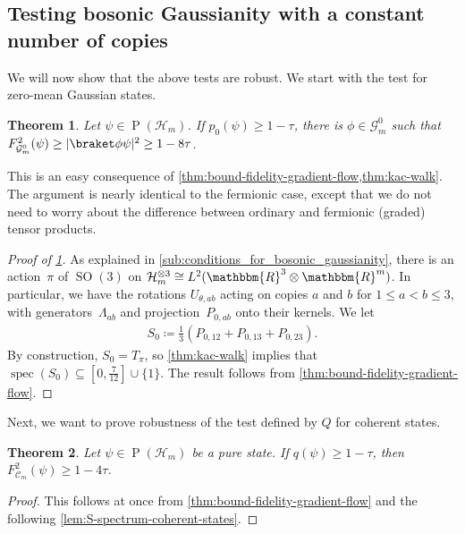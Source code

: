 \documentclass[11pt,a4paper]{article}
\newtheorem{theorem}{Theorem}[section]
\numberwithin{equation}{section}
\newcommand{\ot}{\otimes}
\newcommand{\RR}{\mathbbm{R}}
\newcommand{\HH}{\mathcal{H}}
\newcommand{\GG}{\mathcal G}
\newcommand{\1}{\mathbf{1}}
\renewcommand{\P}{\operatorname{P}}
\DeclareMathOperator{\SO}{SO}
\DeclareMathOperator{\spec}{spec}
\DeclarePairedDelimiter\abs{\lvert}{\rvert}
\begin{document}
\subsection{Testing bosonic Gaussianity with a constant number of copies}
We will now show that the above tests are robust.
We start with the test for zero-mean Gaussian states.

\begin{theorem}\label{thm:main boson mean zero}
    Let $\psi \in \P(\HH_m)$.
    If $p_0(\psi) \geq 1 - \tau$, there is $\phi\in\GG_m^0$ such that $F^2_{\GG_m^0}(\psi) \geq \abs{\braket\phi\psi}^2 \geq 1-8\tau$.
\end{theorem}

\noindent
This is an easy consequence of \cref{thm:bound-fidelity-gradient-flow,thm:kac-walk}.
The argument is nearly identical to the fermionic case, except that we do not need to worry about the difference between ordinary and fermionic (graded) tensor products.

\begin{proof}[Proof of \cref{thm:main boson mean zero}]
    As explained in \cref{sub:conditions_for_bosonic_gaussianity}, there is an action~$\pi$ of $\SO(3)$ on $\HH_m^{\ot 3} \cong L^2(\RR^3 \ot \RR^m)$.
    In particular, we have the rotations $U_{\theta,ab}$ acting on copies $a$ and $b$ for $1 \leq a < b \leq 3$,
    with generators~$\Lambda_{ab}$ and projection~$P_{0,ab}$ onto their kernels.
    We let
    \begin{align*}
        S_0 \coloneqq \frac{1}{3}\left(P_{0,12} + P_{0,13} + P_{0,23}\right).
    \end{align*}
    By construction, $S_0 = T_\pi$, so \cref{thm:kac-walk} implies that $\spec(S_0) \subseteq [0,\frac{7}{12}] \cup \{1\}$.
    The result follows from \cref{thm:bound-fidelity-gradient-flow}.
\end{proof}

Next, we want to prove robustness of the test defined by $Q$ for coherent states.

\begin{theorem}\label{thm:main boson coherent}
    Let $\psi \in \P(\HH_m)$ be a pure state. If $q(\psi) \geq 1 - \tau$, then $F^2_{\mathcal C_m}(\psi) \geq 1 - 4\tau$.
\end{theorem}
\begin{proof}
This follows at once from \cref{thm:bound-fidelity-gradient-flow} and the following \cref{lem:S-spectrum-coherent-states}.
\end{proof}
\end{document}
